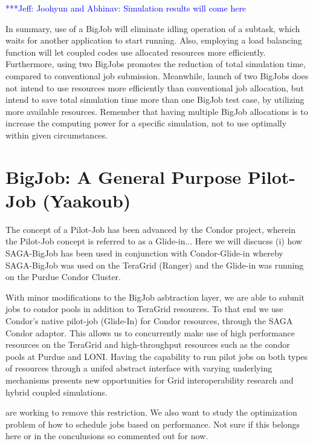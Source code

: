 \documentclass[conference,final]{IEEEtran}
\newcommand{\skonote}[1]{ {\textcolor{blue} { ***Jeff: #1 }}}
\newcommand{\skonote}[1]{}
\begin{document}
\skonote{Joohyun and Abhinav: Simulation results will come here}

In summary, use of a BigJob will eliminate idling operation of a subtask, which waits for 
another application to start running. Also, employing a load balancing function will let 
coupled codes use allocated resources more efficiently. Furthermore, using two BigJobs 
promotes the reduction of total simulation time, compared to conventional job submission. 
Meanwhile, launch of two BigJobs does not intend to use resources more efficiently than 
conventional job allocation, but intend to save total simulation time more than one 
BigJob test case, by utilizing more available resources. Remember that having multiple 
BigJob allocations is to increase the computing power for a specific simulation, not to 
use optimally within given circumstances.


\section{BigJob: A General Purpose Pilot-Job (Yaakoub)}

The concept of a Pilot-Job has been advanced by the Condor project, wherein the Pilot-Job 
concept is referred to as a Glide-in... Here we will discucss (i) how SAGA-BigJob has 
been used in conjunction with Condor-Glide-in whereby SAGA-BigJob was used on the 
TeraGrid (Ranger) and the Glide-in was running on the Purdue Condor Cluster.

With minor modifications to the BigJob asbtraction layer, we are able to submit jobs to 
condor pools in addition to TeraGrid resources. To that end we use Condor's native 
pilot-job (Glide-In) for Condor resources, through the SAGA Condor adaptor. This allows 
us to concurrently make use of high performance resources on the TeraGrid and 
high-throughput resources such as the condor pools at Purdue and LONI. Having the 
capability to run pilot jobs on both types of resources through a unifed abstract 
interface with varying underlying mechanisms presents new opportunities for Grid 
interoperability research and hybrid coupled simulations.

are working to remove this restriction. We also want to study the optimization problem of 
how to schedule jobs based on performance. Not sure if this belongs here or in the 
conculusions so commented out for now.
\end{document}
